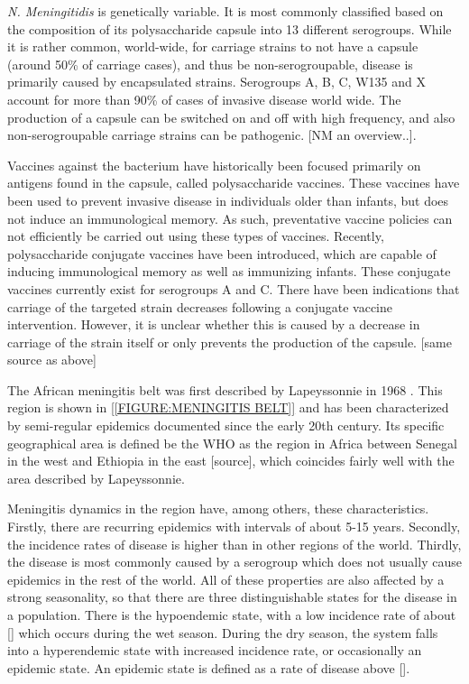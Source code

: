 \documentclass[10pt,a4paper]{article}
\begin{document}


\emph{N. Meningitidis} is genetically variable. It is most commonly classified based on the composition of its polysaccharide capsule into 13 different serogroups. While it is rather common, world-wide, for carriage strains to not have a capsule (around 50\% of carriage cases), and thus be non-serogroupable, disease is primarily caused by encapsulated strains. Serogroups A, B, C, W135 and X account for more than 90\% of cases of invasive disease world wide. The production of a capsule can be switched on and off with high frequency, and also non-serogroupable carriage strains can be pathogenic. [NM an overview..].

Vaccines against the bacterium have historically been focused primarily on antigens found in the capsule, called polysaccharide vaccines. These vaccines have been used to prevent invasive disease in individuals older than infants, but does not induce an immunological memory. As such, preventative vaccine policies can not efficiently be carried out using these types of vaccines. Recently, polysaccharide conjugate vaccines have been introduced, which are capable of inducing immunological memory as well as immunizing infants. These conjugate vaccines currently exist for serogroups A and C. There have been indications that carriage of the targeted strain decreases following a conjugate vaccine intervention. However, it is unclear whether this is caused by a decrease in carriage of the strain itself or only prevents the production of the capsule. [same source as above]


The African meningitis belt was first described by Lapeyssonnie in 1968 \cite{lapeyssonnie}. This region is shown in \cref{[FIGURE:MENINGITIS BELT]} and has been characterized by semi-regular epidemics documented since the early 20th century. Its specific geographical area is defined be the WHO as the region in Africa between Senegal in the west and Ethiopia in the east [source], which coincides fairly well with the area described by Lapeyssonnie.

Meningitis dynamics in the region have, among others, these characteristics. Firstly, there are recurring epidemics with intervals of about 5-15 years. Secondly, the incidence rates of disease is higher than in other regions of the world. Thirdly, the disease is most commonly caused by a serogroup which does not usually cause epidemics in the rest of the world. All of these properties are also affected by a strong seasonality, so that there are three distinguishable states for the disease in a population. There is the hypoendemic state, with a low incidence rate of about [] which occurs during the wet season. During the dry season, the system falls into a hyperendemic state with increased incidence rate, or occasionally an epidemic state. An epidemic state is defined as a rate of disease above []. \cite{mueller2010hypothetical}
\end{document}
